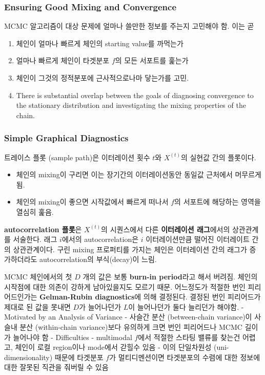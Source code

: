 \documentclass[
]{book}
\providecommand{\tightlist}{%
  \setlength{\itemsep}{0pt}\setlength{\parskip}{0pt}}
\begin{document}
\hypertarget{ensuring-good-mixing-and-convergence}{%
\subsubsection{Ensuring Good Mixing and Convergence}\label{ensuring-good-mixing-and-convergence}}

MCMC 알고리즘이 대상 문제에 얼마나 쓸만한 정보를 주는지 고민해야 함. 이는 곧

\begin{enumerate}
\def\labelenumi{\arabic{enumi}.}
\tightlist
\item
  체인이 얼마나 빠르게 체인의 starting value를 까먹는가
\item
  얼마나 빠르게 체인이 타겟분포 \(f\)의 모든 서포트를 훑는가
\item
  체인이 그것의 정적분포에 근사적으로나마 닿는가를 고민.
\item
  There is substantial overlap between the goals of diagnosing convergence to the stationary distribution and investigating the mixing properties of the chain.
\end{enumerate}

\hypertarget{simple-graphical-diagnostics}{%
\subsubsection{Simple Graphical Diagnostics}\label{simple-graphical-diagnostics}}

트레이스 플롯 (sample path)은 이터레이션 횟수 \(t\)와 \(X^{(t)}\)의 실현값 간의 플롯이다.

\begin{itemize}
\tightlist
\item
  체인의 mixing이 구리면 이는 장기간의 이터레이션동안 동일값 근처에서 머무르게 됨.
\item
  체인의 mixing이 좋으면 시작값에서 빠르게 떠나서 \(f\)의 서포트에 해당하는 영역을 열심히 훑음.
\end{itemize}

\textbf{autocorrelation 플롯}은 \(X^{(t)}\)의 시퀀스에서 다른 \textbf{이터레이션 래그}에서의 상관관계를 서술한다. 래그 \(i\)에서의 autocorrelation은 \(i\) 이터레이션만큼 떨어진 이터레이트 간의 상관관계이다. 구린 mixing 프로퍼티를 가지는 체인은 이터레이션 간의 래그가 증가하더라도 autocorrelation의 부식(decay)이 느림.

MCMC 체인에서의 첫 \(D\) 개의 값은 보통 \textbf{burn-in period}라고 해서 버려짐. 체인의 시작점에 대한 의존이 강하게 남아있을지도 모르기 때문. 어느정도가 적절한 번인 피리어드인가는 \textbf{Gelman-Rubin diagnostics}에 의해 결정된다. 결정된 번인 피리어드가 제대로 된 값을 못내면 \(D\)가 늘어나던가 \(L\)이 늘어나던가 둘다 늘리던가 해야함.
- Motivated by an Analysis of Variance
- 사슬간 분산 (between-chain variance)이 사슬내 분산 (within-chain variance)보다 유의하게 크면 번인 피리어드나 MCMC 길이가 늘어나야 함
- Difficulties
- multimodal \(f\)에서 적절한 스타팅 밸류를 찾는건 어렵고, 체인이 로컬 region이나 mode에서 갇힐수 있음
- 이의 단일차원성 (uni-dimensionality) 때문에 타겟분포 \(f\)가 멀티디멘션이면 타겟분포의 수렴에 대한 정보에 대한 잘못된 직관을 줘버릴 수 있음
\end{document}
